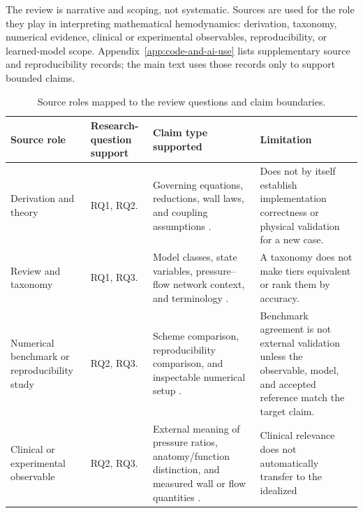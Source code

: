 The review is narrative and scoping, not systematic. Sources are used for the
role they play in interpreting mathematical hemodynamics: derivation, taxonomy,
numerical evidence, clinical or experimental observables, reproducibility, or
learned-model scope. Appendix~\ref{app:code-and-ai-use} lists supplementary
source and reproducibility records; the main text uses those records only to
support bounded claims.

\begin{table}[!htb]
    \centering
    \scriptsize
    \caption{Source roles mapped to the review questions and claim boundaries.}
    \label{tab:intro-source-roles}
    \begin{tabularx}{\textwidth}{@{}
        >{\raggedright\arraybackslash}p{}
        >{\raggedright\arraybackslash}p{}
        >{\raggedright\arraybackslash}p{}
        >{\raggedright\arraybackslash}X@{}}
        \toprule
        \textbf{Source role} & \textbf{Research-question support} & \textbf{Claim type supported} & \textbf{Limitation} \\
        \midrule
        Derivation and theory
            & RQ1, RQ2.
            & Governing equations, reductions, wall laws, and coupling assumptions
            \cite{FormaggiaEtAl2003OneDimensionalBloodFlow,QuarteroniVeneziani2003GeometricalMultiscale}.
            & Does not by itself establish implementation correctness or physical
            validation for a new case. \\
        Review and taxonomy
            & RQ1, RQ3.
            & Model classes, state variables, pressure--flow network context, and
            terminology
            \cite{ShiEtAl2011BloodFlowModelReview}.
            & A taxonomy does not make tiers equivalent or rank them by accuracy. \\
        Numerical benchmark or reproducibility study
            & RQ2, RQ3.
            & Scheme comparison, reproducibility comparison, and inspectable numerical setup
            \cite{BoileauEtAl2015Benchmark,BenemeritoEtAl2024OpenBF}.
            & Benchmark agreement is not external validation unless the observable,
            model, and accepted reference match the target claim. \\
        Clinical or experimental observable
            & RQ2, RQ3.
            & External meaning of pressure ratios, anatomy/function distinction, and
            measured wall or flow quantities
            \cite{ToninoEtAl2010FAMEAngioFunctional,Blanco2018FFR1D3D}.
            & Clinical relevance does not automatically transfer to the idealized

\end{tabularx}
\end{table}
